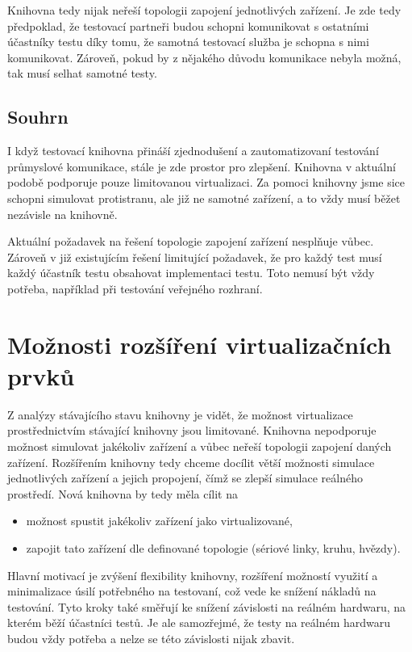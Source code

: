 Knihovna tedy nijak neřeší topologii zapojení jednotlivých zařízení. Je zde tedy předpoklad, že testovací partneři budou schopni komunikovat s ostatními účastníky testu díky tomu, že samotná testovací služba je schopna s nimi komunikovat. Zároveň, pokud by z nějakého důvodu komunikace nebyla možná, tak musí selhat samotné testy.

\subsection{Souhrn}

I když testovací knihovna přináší zjednodušení a zautomatizovaní testování průmyslové komunikace, stále je zde prostor pro zlepšení. Knihovna v aktuální podobě podporuje pouze limitovanou virtualizaci. Za pomoci knihovny jsme sice schopni simulovat protistranu, ale již ne samotné zařízení, a to vždy musí běžet nezávisle na knihovně. 

Aktuální požadavek na řešení topologie zapojení zařízení nesplňuje vůbec. Zároveň v již existujícím řešení limitující požadavek, že pro každý test musí každý účastník testu obsahovat implementaci testu. Toto nemusí být vždy potřeba, například při testování veřejného rozhraní. 

\section{Možnosti rozšíření virtualizačních prvků}

Z analýzy stávajícího stavu knihovny je vidět, že možnost virtualizace prostřednictvím stávající knihovny jsou limitované. Knihovna nepodporuje možnost simulovat jakékoliv zařízení a vůbec neřeší topologii zapojení daných zařízení. Rozšířením knihovny tedy chceme docílit větší možnosti simulace jednotlivých zařízení a jejich propojení, čímž se zlepší simulace reálného prostředí. Nová knihovna by tedy měla cílit na

\begin{itemize}
    \item možnost spustit jakékoliv zařízení jako virtualizované,
    \item zapojit tato zařízení dle definované topologie (sériové linky, kruhu, hvězdy).
\end{itemize}

Hlavní motivací je zvýšení flexibility knihovny, rozšíření možností využití a minimalizace úsilí potřebného na testovaní, což vede ke snížení nákladů na testování. Tyto kroky také směřují ke snížení závislosti na reálném hardwaru, na kterém běží účastníci testů. Je ale samozřejmé, že testy na reálném hardwaru budou vždy potřeba a nelze se této závislosti nijak zbavit.

